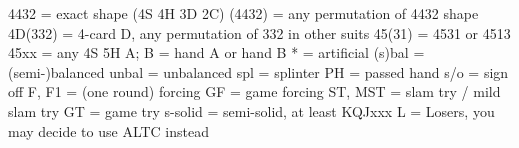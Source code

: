 4432    = exact shape (4S 4H 3D 2C)
(4432)  = any permutation of 4432 shape
4D(332) = 4-card D, any permutation of 332 in other suits
45(31)  = 4531 or 4513
45xx    = any 4S 5H
A; B    = hand A or hand B
*       = artificial
(s)bal  = (semi-)balanced
unbal   = unbalanced
spl     = splinter
PH      = passed hand
s/o     = sign off
F, F1   = (one round) forcing
GF      = game forcing
ST, MST = slam try / mild slam try
GT      = game try
s-solid = semi-solid, at least KQJxxx
L       = Losers, you may decide to use ALTC instead